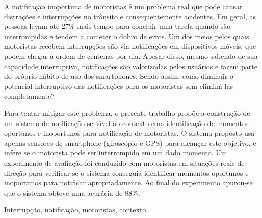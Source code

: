 A notificação inoportuna de motoristas é um problema real que pode causar distrações e interrupções no trânsito e
consequentemente acidentes. Em geral, as pessoas levam até 27\% mais tempo para concluir uma tarefa quando são interrompidas
e tendem a cometer o dobro de erros. Um dos meios pelos quais motoristas recebem interrupções são via notificações
em dispositivos móveis, que podem chegar à ordem de centenas por dia. Apesar disso, mesmo sabendo de sua capacidade
interruptiva, notificações são valorizadas pelos usuários e fazem parte do próprio hábito de uso dos smartphones.
Sendo assim, como diminuir o potencial interruptivo das notificações para os motoristas sem eliminá-las completamente?

Para tentar mitigar este problema, o presente trabalho propõe a construção de um sistema de notificação sensível ao
contexto com identificação de momentos oportunos e inoportunos para notificação de motoristas. O sistema proposto usa
apenas sensores de smartphone (giroscópio e GPS) para alcançar este objetivo, e infere se o motorista pode ser
interrompido em um dado momento. Um experimento de avaliação foi conduzido com motoristas em situações reais de direção
para verificar se o sistema conseguia identificar momentos oportunos e inoportunos para notificar apropriadamente. Ao
final do experimento apurou-se que o sistema obteve uma acurácia de 88\%.

\begin{keywords}
Interrupção, notificação, motoristas, contexto.
\end{keywords}
